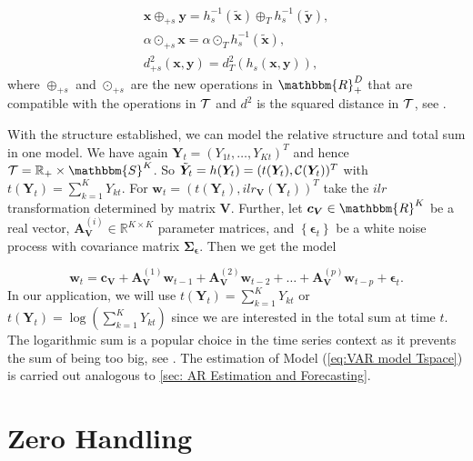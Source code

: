 \begin{gather}
\bm{x} \oplus_{+s} \bm{y} = h_s^{-1}(\tilde{\bm{x}}) \oplus_T  h_s^{-1}(\tilde{\bm{y}}), \\
\alpha \odot_{+s} \bm{x} = \alpha \odot_T h_s^{-1}(\tilde{\bm{x}}), \\
d_{+s}^2(\bm{x},\bm{y}) = d_T^2(h_s(\bm{x},\bm{y})),
\label{eq:Vector Space Operations sum}
\end{gather}
%
where $\oplus_{+s}$ and $\odot_{+s}$ are the new operations in $\mathbbm{R}_+^D$ that are compatible with the operations in $\mathcal{T}$ and $d^2$ is the squared distance in $\mathcal{T}$, see \textcite{Pawlowsky:2013}. 

With the structure established, we can model the relative structure and total sum in one model.  We have again $\bm{Y}_t=(Y_{1t},\ldots,Y_{Kt})^T$ and hence $\Tsp = \mathbb{R}_+ \times \mathbbm{S}^K$. So $\tilde{\bm{Y}}_t=h(\bm{Y}_t)=(t(\bm{Y}_t),\mathcal{C}(\bm{Y}_t))^T$ with $t(\bm{Y}_t)=\sum_{k=1}^K Y_{kt}$. For $\bm{w}_t =(t(\bm{Y}_t),ilr_{\bm{V}}(\bm{Y}_t))^T$ take the $ilr$ transformation determined by matrix $\bm{V}$. Further, let $\bm{c}_{\bm{V}} \in \mathbbm{R}^K$ be a real vector, $\textbf{A}_{\textbf{V}}^{(i)} \in \mathbb{R}^{K \times K}$ parameter matrices, and $\left\{\bm{\epsilon}_t\right\}$ be a white noise process with covariance matrix $\bm{\Sigma_\epsilon}$. Then we get the model 

\begin{equation}
\textbf{w}_t = \textbf{c}_{\textbf{V}} + \textbf{A}_{\textbf{V}}^{(1)}\textbf{w}_{t-1} + \textbf{A}_{\textbf{V}}^{(2)}\textbf{w}_{t-2} + \ldots + \textbf{A}_{\textbf{V}}^{(p)}\textbf{w}_{t-p} + \bm{\epsilon}_{t}.
\label{eq:VAR model Tspace}
\end{equation}
%
In our application, we will use $t(\bm{Y}_t)=\sum_{k=1}^K Y_{kt}$ or $t(\bm{Y}_t)=\log(\sum_{k=1}^K Y_{kt})$ since we are interested in the total sum at time $t$. The logarithmic sum is a popular choice in the time series context as it prevents the sum of being too big, see \textcite{Kynclova:2015}. The estimation of Model (\ref{eq:VAR model Tspace}) is carried out analogous to \ref{sec: AR Estimation and Forecasting}. 

\section{Zero Handling}
\label{sec: Zero-Handling}

